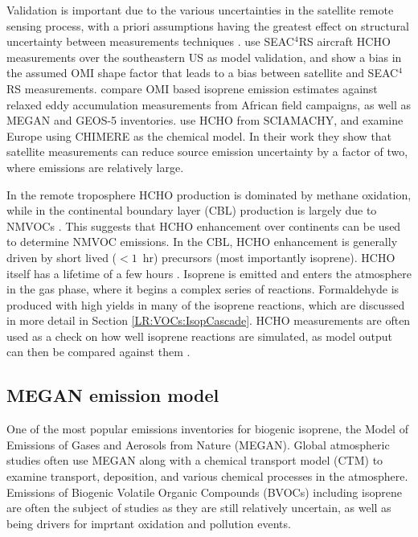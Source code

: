     
    Validation is important due to the various uncertainties in the satellite remote sensing process, with a priori assumptions having the greatest effect on structural uncertainty between measurements techniques \textcite{Lorente2017}.
    \textcite{Zhu2016} use SEAC$^4$RS aircraft HCHO measurements over the southeastern US as model validation, and show a bias in the assumed OMI shape factor that leads to a bias between satellite and SEAC$^4$RS measurements.
    \textcite{Marais2014} compare OMI based isoprene emission estimates against relaxed eddy accumulation measurements from African field campaigns, as well as MEGAN and GEOS-5 inventories.
    \textcite{Dufour2009} use HCHO from SCIAMACHY, and examine Europe using CHIMERE as the chemical model. 
    In their work they show that satellite measurements can reduce source emission uncertainty by a factor of two, where emissions are relatively large.
    
    In the remote troposphere HCHO production is dominated by methane oxidation, while in the continental boundary layer (CBL) production is largely due to NMVOCs \parencite{Abbot2003, Kefauver2014}.
    This suggests that HCHO enhancement over continents can be used to determine NMVOC emissions.
    In the CBL, HCHO enhancement is generally driven by short lived ($<1$~hr) precursors (most importantly isoprene).
    HCHO itself has a lifetime of a few hours \parencite{Kefauver2014}.
    Isoprene is emitted and enters the atmosphere in the gas phase, where it begins a complex series of reactions.
    Formaldehyde is produced with high yields in many of the isoprene reactions, which are discussed in more detail in Section \ref{LR:VOCs:IsopCascade}.
    HCHO measurements are often used as a check on how well isoprene reactions are simulated, as model output can then be compared against them \parencite{Marvin2017}.
  
  \subsection{MEGAN emission model}
    One of the most popular emissions inventories for biogenic isoprene, the Model of Emissions of Gases and Aerosols from Nature (MEGAN).
    Global atmospheric studies often use MEGAN along with a chemical transport model (CTM) to examine transport, deposition, and various chemical processes in the atmosphere.
    Emissions of Biogenic Volatile Organic Compounds (BVOCs) including isoprene are often the subject of studies as they are still relatively uncertain, as well as being drivers for imprtant oxidation and pollution events.
    
